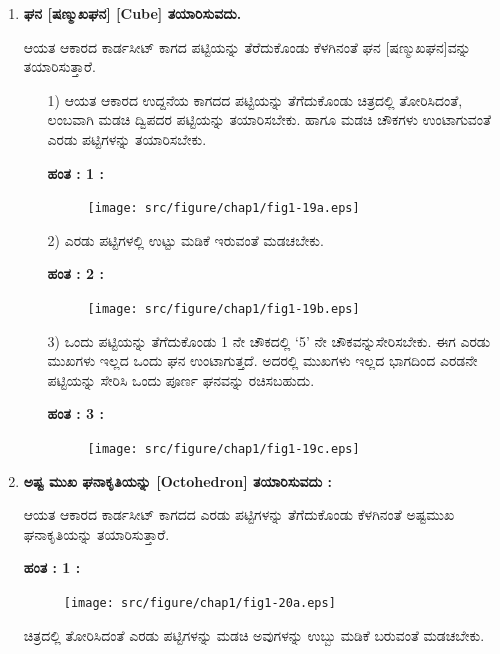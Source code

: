 \begin{enumerate}
\item \textbf{ಘನ [ಷಣ್ಮುಖಘನ] [Cube] ತಯಾರಿಸುವದು. }

ಆಯತ ಆಕಾರದ ಕಾರ್ಡಸೀಟ್ ಕಾಗದ ಪಟ್ಟಿಯನ್ನು ತೆರೆದುಕೊಂಡು ಕೆಳಗಿನಂತೆ ಘನ [ಷಣ್ಮುಖಘನ]ವನ್ನು ತಯಾರಿಸುತ್ತಾರೆ. 
\begin{itemize}
\item[1)] ಆಯತ ಆಕಾರದ ಉದ್ದನೆಯ ಕಾಗದದ ಪಟ್ಟಿಯನ್ನು ತೆಗೆದುಕೊಂಡು ಚಿತ್ರದಲ್ಲಿ ತೋರಿಸಿದಂತೆ, ಲಂಬವಾಗಿ ಮಡಚಿ ದ್ವಿಪದರ ಪಟ್ಟಿಯನ್ನು ತಯಾರಿಸಬೇಕು. ಹಾಗೂ ಮಡಚಿ ಚೌಕಗಳು ಉಂಟಾಗುವಂತೆ ಎರಡು ಪಟ್ಟಿಗಳನ್ನು ತಯಾರಿಸಬೇಕು.

\noindent
\textbf{ಹಂತ : 1 :}
\begin{figure}[H]
\centering
\texttt{[image: src/figure/chap1/fig1-19a.eps]}
\end{figure}

\item[2)] ಎರಡು ಪಟ್ಟಿಗಳಲ್ಲಿ ಉಟ್ಟು ಮಡಿಕೆ ಇರುವಂತೆ ಮಡಚಬೇಕು. 

\eject

\noindent
\textbf{ಹಂತ : 2 :}
\begin{figure}[H]
\centering
\texttt{[image: src/figure/chap1/fig1-19b.eps]}
\end{figure}

\item[3)] ಒಂದು ಪಟ್ಟಿಯನ್ನು ತೆಗೆದುಕೊಂಡು 1 ನೇ ಚೌಕದಲ್ಲಿ `5' ನೇ ಚೌಕವನ್ನು\break ಸೇರಿಸಬೇಕು. ಈಗ ಎರಡು ಮುಖಗಳು ಇಲ್ಲದ ಒಂದು ಘನ ಉಂಟಾಗು\-ತ್ತದೆ. ಅದರಲ್ಲಿ ಮುಖಗಳು ಇಲ್ಲದ ಭಾಗದಿಂದ ಎರಡನೇ ಪಟ್ಟಿಯನ್ನು ಸೇರಿಸಿ ಒಂದು ಪೂರ್ಣ ಘನವನ್ನು ರಚಿಸಬಹುದು. 

\noindent
\textbf{ಹಂತ : 3 :} 
\begin{figure}[H]
\centering
\texttt{[image: src/figure/chap1/fig1-19c.eps]}\\
\hspace{3.5cm} 
\end{figure}
\end{itemize}

\item \textbf{ಅಷ್ಟ ಮುಖ ಘನಾಕೃತಿಯನ್ನು [Octohedron] ತಯಾರಿಸುವದು :}

ಆಯತ ಆಕಾರದ ಕಾರ್ಡಸೀಟ್ ಕಾಗದದ ಎರಡು ಪಟ್ಟಿಗಳನ್ನು ತೆಗೆದುಕೊಂಡು ಕೆಳಗಿನಂತೆ ಅಷ್ಟಮುಖ ಘನಾಕೃತಿಯನ್ನು ತಯಾರಿಸುತ್ತಾರೆ. 

\eject


\noindent
\textbf{ಹಂತ : 1 :}
\begin{figure}[H]
\centering
\texttt{[image: src/figure/chap1/fig1-20a.eps]}
\end{figure}

ಚಿತ್ರದಲ್ಲಿ ತೋರಿಸಿದಂತೆ ಎರಡು ಪಟ್ಟಿಗಳನ್ನು ಮಡಚಿ ಅವುಗಳನ್ನು ಉಬ್ಬು ಮಡಿಕೆ ಬರುವಂತೆ ಮಡಚಬೇಕು.


\end{enumerate}
